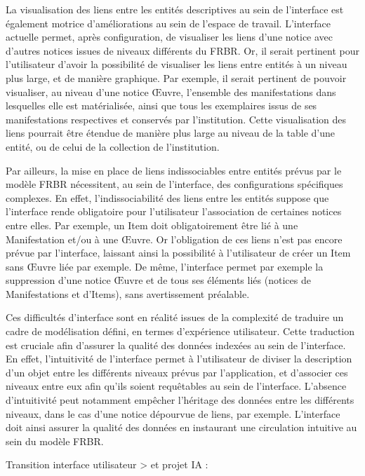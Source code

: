 La visualisation des liens entre les entités descriptives au sein de l’interface est également motrice d’améliorations au sein de l’espace de travail. L'interface actuelle permet, après configuration, de visualiser les liens d’une notice avec d’autres notices issues de niveaux différents du FRBR. Or, il serait pertinent pour l’utilisateur d’avoir la possibilité de visualiser les liens entre entités à un niveau plus large, et de manière graphique. Par exemple, il serait pertinent de pouvoir visualiser, au niveau d’une notice Œuvre, l'ensemble des manifestations dans lesquelles elle est matérialisée, ainsi que tous les exemplaires issus de ses manifestations respectives et conservés par l’institution. Cette visualisation des liens pourrait être étendue de manière plus large au niveau de la table d’une entité, ou de celui de la collection de l’institution.  

Par ailleurs, la mise en place de liens indissociables entre entités prévus par le modèle FRBR nécessitent, au sein de l’interface, des configurations spécifiques complexes. En effet, l’indissociabilité des liens entre les entités suppose que l’interface rende obligatoire pour l’utilisateur l’association de certaines notices entre elles. Par exemple, un Item doit obligatoirement être lié à une Manifestation et/ou à une Œuvre. Or l’obligation de ces liens n’est pas encore prévue par l’interface, laissant ainsi la possibilité à l’utilisateur de créer un Item sans Œuvre liée par exemple. De même, l’interface permet par exemple la suppression d'une notice Œuvre et de tous ses éléments liés (notices de Manifestations et d’Items), sans avertissement préalable. 

Ces difficultés d’interface sont en réalité issues de la complexité de traduire un cadre de modélisation défini, en termes d’expérience utilisateur. Cette traduction est cruciale afin d’assurer la qualité des données indexées au sein de l’interface. En effet, l’intuitivité de l'interface permet à l'utilisateur de diviser la description d’un objet entre les différents niveaux prévus par l’application, et d’associer ces niveaux entre eux afin qu’ils soient requêtables au sein de l’interface. L’absence d’intuitivité peut notamment empêcher l’héritage des données entre les différents niveaux, dans le cas d’une notice dépourvue de liens, par exemple. L’interface doit ainsi assurer la qualité des données en instaurant une circulation intuitive au sein du modèle FRBR.  

Transition interface utilisateur > et projet IA : 


